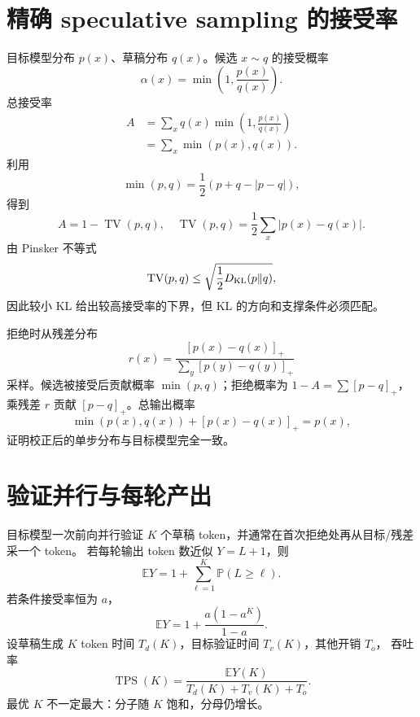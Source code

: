\documentclass[11pt]{article}
\numberwithin{equation}{section}
\newcommand{\E}{\mathbb{E}}
\newcommand{\Pp}{\mathbb{P}}
\newcommand{\1}{\mathbf{1}}
\begin{document}
\section{精确 speculative sampling 的接受率}

目标模型分布 $p(x)$、草稿分布 $q(x)$。候选 $x\sim q$ 的接受概率
\begin{equation}
 \alpha(x)=\min\left(1,\frac{p(x)}{q(x)}\right).
\end{equation}
总接受率
\begin{align}
 A&=\sum_xq(x)\min\left(1,\frac{p(x)}{q(x)}\right)\\
 &=\sum_x\min(p(x),q(x)).
\end{align}
利用
\begin{equation}
 \min(p,q)=\frac12(p+q-|p-q|),
\end{equation}
得到
\begin{equation}
 \boxed{A=1-\operatorname{TV}(p,q),
 \quad \operatorname{TV}(p,q)=\frac12\sum_x|p(x)-q(x)|.}
\end{equation}
由 Pinsker 不等式
\begin{equation}
 \operatorname{TV}(p,q)
 \le\sqrt{\frac12D_{\rm KL}(p\|q)},
\end{equation}
因此较小 KL 给出较高接受率的下界，但 KL 的方向和支撑条件必须匹配。

拒绝时从残差分布
\begin{equation}
 r(x)=\frac{[p(x)-q(x)]_+}{\sum_y[p(y)-q(y)]_+}
\end{equation}
采样。候选被接受后贡献概率 $\min(p,q)$；拒绝概率为
$1-A=\sum[p-q]_+$，乘残差 $r$ 贡献 $[p-q]_+$。总输出概率
\begin{equation}
 \min(p(x),q(x))+[p(x)-q(x)]_+=p(x),
\end{equation}
证明校正后的单步分布与目标模型完全一致。

\section{验证并行与每轮产出}

目标模型一次前向并行验证 $K$ 个草稿 token，并通常在首次拒绝处再从目标/残差采一个 token。
若每轮输出 token 数近似 $Y=L+1$，则
\begin{equation}
 \E Y=1+\sum_{\ell=1}^{K}\Pp(L\ge\ell).
\end{equation}
若条件接受率恒为 $a$，
\begin{equation}
 \E Y=1+\frac{a(1-a^K)}{1-a}.
\end{equation}
设草稿生成 $K$ token 时间 $T_d(K)$，目标验证时间 $T_v(K)$，其他开销 $T_o$，
吞吐率
\begin{equation}
 \operatorname{TPS}(K)=
 \frac{\E Y(K)}{T_d(K)+T_v(K)+T_o}.
\end{equation}
最优 $K$ 不一定最大：分子随 $K$ 饱和，分母仍增长。
\end{document}
